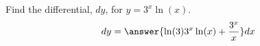 \documentclass{ximera}
\author{Gregory Hartman \and Matthew Carr}
\begin{document}
\begin{exercise}




Find the differential, $dy$, for $y=3^{x}\ln(x)$.
\[
dy=\answer{\ln(3)3^{x}\ln(x)+\frac{3^{x}}{x}}dx
\]

\end{exercise}
\end{document}
